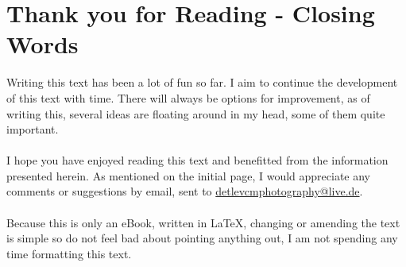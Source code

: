 \chapter{Thank you for Reading - Closing Words}

Writing this text has been a lot of fun so far. I aim to continue the development of this text with time. There will always be options for improvement, as of writing this, several ideas are floating around in my head, some of them quite important.
\\
\\
I hope you have enjoyed reading this text and benefitted from the information presented herein. As mentioned on the initial page, I would appreciate any comments or suggestions by email, sent to \href{mailto:detlevcmphotography@live.de}{detlevcmphotography@live.de}.
\\
\\
Because this is only an eBook, written in LaTeX, changing or amending the text is simple so do not feel bad about pointing anything out, I am not spending any time formatting this text.
